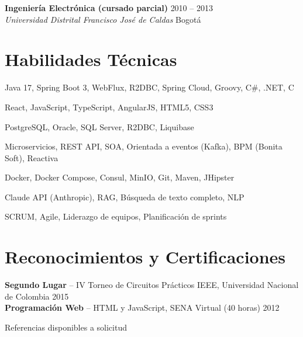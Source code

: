 \documentclass[11pt,a4paper]{article}
\begin{document}
\textbf{Ingenier\'{i}a Electr\'{o}nica (cursado parcial)} \hfill {\color{lighttext} 2010 -- 2013} \\
\textit{Universidad Distrital Francisco Jos\'{e} de Caldas} \hfill Bogot\'{a}

\section{Habilidades T\'{e}cnicas}

\begin{description}[leftmargin=9.5em, labelwidth=9em, labelsep=0.5em, nosep, font=\bfseries\color{darktext}]
    \item[Backend] Java 17, Spring Boot 3, WebFlux, R2DBC, Spring Cloud, Groovy, C\#, .NET, C
    \item[Frontend] React, JavaScript, TypeScript, AngularJS, HTML5, CSS3
    \item[Bases de Datos] PostgreSQL, Oracle, SQL Server, R2DBC, Liquibase
    \item[Arquitectura] Microservicios, REST API, SOA, Orientada a eventos (Kafka), BPM (Bonita Soft), Reactiva
    \item[DevOps] Docker, Docker Compose, Consul, MinIO, Git, Maven, JHipster
    \item[IA/ML] Claude API (Anthropic), RAG, B\'{u}squeda de texto completo, NLP
    \item[Metodolog\'{i}a] SCRUM, Agile, Liderazgo de equipos, Planificaci\'{o}n de sprints
\end{description}

\section{Reconocimientos y Certificaciones}

\textbf{Segundo Lugar} -- IV Torneo de Circuitos Pr\'{a}cticos IEEE, Universidad Nacional de Colombia \hfill {\color{lighttext} 2015} \\
\textbf{Programaci\'{o}n Web} -- HTML y JavaScript, SENA Virtual (40 horas) \hfill {\color{lighttext} 2012}

\vspace{6pt}

\begin{center}
    {\small\color{lighttext} Referencias disponibles a solicitud}
\end{center}
\end{document}
